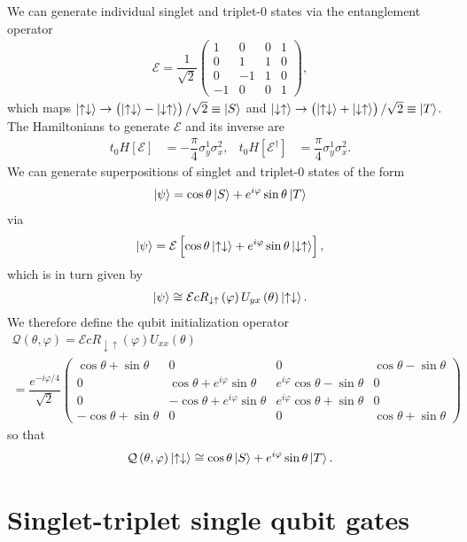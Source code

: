 \documentclass[11pt]{article}
\newcommand{\f}[2]{\dfrac{#1}{#2}} %
\newcommand{\p}[1]{\left(#1\right)} %
\renewcommand{\sp}[1]{\left[#1\right]} %
\renewcommand{\d}{\partial} %
\renewcommand{\phi}{\varphi} %
\newcommand{\m}[1]{\begin{pmatrix}#1\end{pmatrix}} %
\renewcommand{\u}{\uparrow}
\renewcommand{\d}{\downarrow}
\newcommand{\E}{\mathcal E}
\begin{document}
We can generate individual singlet and triplet-0 states via the
entanglement operator
\begin{align}
  \E=\f1{\sqrt2}
  \m{1 & 0 & 0 & 1 \\
    0 & 1 & 1 & 0 \\
    0 & -1 & 1 & 0 \\
    -1 & 0 & 0 & 1},
\end{align}
which maps $\ket{\u\d}\to\p{\ket{\u\d}-\ket{\d\u}}/\sqrt2\equiv\ket S$
and $\ket{\d\u}\to\p{\ket{\u\d}+\ket{\d\u}}/\sqrt2\equiv\ket T$. The
Hamiltonians to generate $\E$ and its inverse are
\begin{align}
  t_0H\sp{\mathcal E}&=-\f\pi4\sigma_y^1\sigma_x^2, & t_0H\sp{\mathcal
    E^\dag}&=\f\pi4\sigma_y^1\sigma_x^2.
\end{align}
We can generate superpositions of singlet and triplet-0 states of the
form
\begin{align}
  \ket\psi=\cos\theta\ket S+e^{i\phi}\sin\theta\ket T
\end{align}
via
\begin{align}
  \ket\psi=\E\sp{\cos\theta\ket{\u\d} +e^{i\phi}\sin\theta\ket{\d\u}},
\end{align}
which is in turn given by
\begin{align}
  \ket\psi\cong\E cR_{\d\u}\p{\phi}U_{yx}\p\theta\ket{\u\d}.
\end{align}
We therefore define the qubit initialization operator
\begin{multline}
  \mathcal Q\p{\theta,\phi}
  =\E cR_{\d\u}\p{\phi}U_{xx}\p\theta \\
  =\f{e^{-i\phi/4}}{\sqrt2}
  \m{ \cos\theta+\sin\theta & 0 & 0 & \cos\theta-\sin\theta \\
    0 & \cos\theta+e^{i\phi}\sin\theta &
    e^{i\phi}\cos\theta-\sin\theta & 0 \\
    0 & -\cos\theta+e^{i\phi}\sin\theta &
    e^{i\phi}\cos\theta+\sin\theta & 0 \\
    -\cos\theta+\sin\theta & 0 & 0 & \cos\theta+\sin\theta}
\end{multline}
so that
\begin{align}
  \mathcal Q\p{\theta,\phi}\ket{\u\d} \cong\cos\theta\ket S
  +e^{i\phi}\sin\theta\ket T.
\end{align}

\newpage
\section*{Singlet-triplet single qubit gates}
\end{document}
